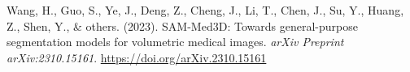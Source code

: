 \documentclass[
]{article}
\newlength{\cslhangindent}
\newenvironment{CSLReferences}[2] %
 {\begin{list}{}{%
  \setlength{\itemindent}{0pt}
  \setlength{\leftmargin}{0pt}
  \setlength{\parsep}{0pt}
  \ifodd #1
   \setlength{\leftmargin}{\cslhangindent}
   \setlength{\itemindent}{-1\cslhangindent}
  \fi
  \setlength{\itemsep}{#2\baselineskip}}}
 {\end{list}}
\begin{document}
\begin{CSLReferences}{1}{0}
Wang, H., Guo, S., Ye, J., Deng, Z., Cheng, J., Li, T., Chen, J., Su,
Y., Huang, Z., Shen, Y., \& others. (2023). {SAM-Med3D}: Towards
general-purpose segmentation models for volumetric medical images.
\emph{arXiv Preprint arXiv:2310.15161}.
\url{https://doi.org/arXiv.2310.15161}

\end{CSLReferences}
\end{document}
